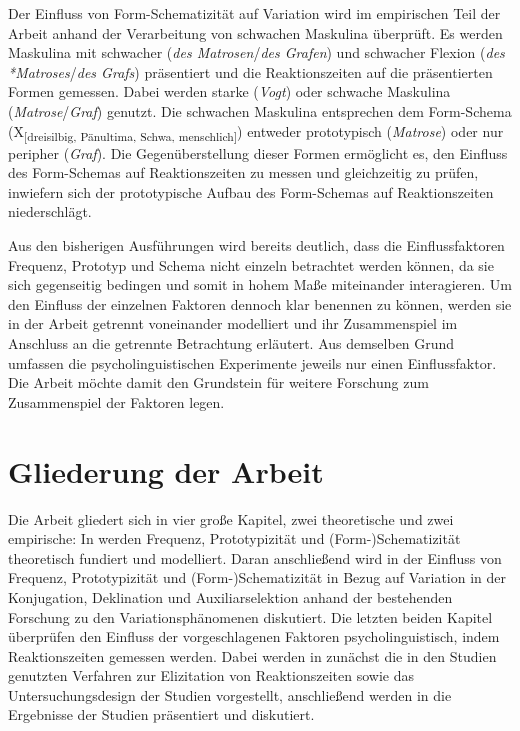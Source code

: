 Der Einfluss von Form-Schematizität auf Variation wird im empirischen Teil der Arbeit anhand der Verarbeitung von schwachen Maskulina überprüft. Es werden Maskulina mit schwacher (\textit{des Matrosen}/\textit{des Grafen}) und schwacher Flexion (\textit{des *Matroses}/\textit{des Grafs}) präsentiert und die Reaktionszeiten auf die präsentierten Formen gemessen. Dabei werden starke (\textit{Vogt}) oder schwache Maskulina (\textit{Matrose}/\textit{Graf}) genutzt. Die schwachen Maskulina entsprechen dem Form-Schema (X\textsubscript{[dreisilbig, Pänultima, Schwa, menschlich]}) entweder prototypisch (\textit{Matrose}) oder nur peripher (\textit{Graf}). Die Gegenüberstellung dieser Formen ermöglicht es, den Einfluss des Form-Schemas auf Reaktionszeiten zu messen und gleichzeitig zu prüfen, inwiefern sich der prototypische Aufbau des Form-Schemas auf Reaktionszeiten niederschlägt. 

Aus den bisherigen Ausführungen wird bereits deutlich, dass die Einflussfaktoren Frequenz, Prototyp und Schema nicht einzeln betrachtet werden können, da sie sich gegenseitig bedingen und somit in hohem Maße miteinander interagieren. Um den Einfluss der einzelnen Faktoren dennoch klar benennen zu können, werden sie in der Arbeit getrennt voneinander modelliert und ihr Zusammenspiel im Anschluss an die getrennte Betrachtung erläutert. Aus demselben Grund umfassen die psycholinguistischen Experimente jeweils nur einen Einflussfaktor. Die Arbeit möchte damit den Grundstein für weitere Forschung zum Zusammenspiel der Faktoren legen.

\section{Gliederung der Arbeit}

Die Arbeit gliedert sich in vier große Kapitel, zwei theoretische und zwei empirische: In  werden Frequenz, Prototypizität und (Form-)Sche\-ma\-ti\-zi\-tät theoretisch fundiert und modelliert. Daran anschließend wird in  der Einfluss von Frequenz, Prototypizität und (Form-)Schematizität in Bezug auf Variation in der Konjugation, Deklination und Auxiliarselektion anhand der bestehenden Forschung zu den Variationsphänomenen diskutiert. Die letzten beiden Kapitel überprüfen den Einfluss der vorgeschlagenen Faktoren psycholinguistisch, indem Reaktionszeiten gemessen werden. Dabei werden in  zunächst die in den Studien genutzten Verfahren zur Elizitation von Reaktionszeiten sowie das Untersuchungsdesign der Studien vorgestellt, anschließend werden in   die Ergebnisse der Studien präsentiert und diskutiert.
 

